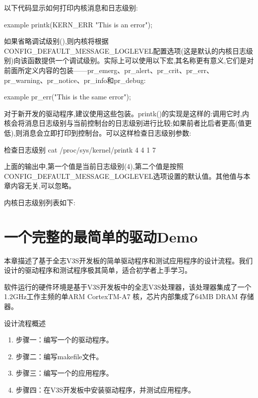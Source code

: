 \documentclass[lang=cn,newtx,10pt,scheme=chinese]{elegantbook}
\begin{document}
以下代码显示如何打印内核消息和日志级别:

\begin{mycode}{example}
    printk(KERN_ERR "This is an error\n");
\end{mycode}

如果省略调试级别(),则内核将根据CONFIG\_DEFAULT\_MESSAGE\_LOGLEVEL配置选项(这是默认的内核日志级别)向该函数提供一个调试级别。实际上可以使用以下宏,其名称更有意义,它们是对前面所定义内容的包装——pr\_emerg、pr\_alert、pr\_crit、pr\_err、pr\_warning、pr\_notice、pr\_info和pr\_debug:

\begin{mycode}{example}
    pr_err("This is the same error\n");
\end{mycode}

对于新开发的驱动程序,建议使用这些包装。printk()的实现是这样的:调用它时,内核会将消息日志级别与当前控制台的日志级别进行比较;如果前者比后者更高(值更低),则消息会立即打印到控制台。可以这样检查日志级别参数:

\begin{mycode}{检查日志级别}
    cat /proc/sys/kernel/printk
    4 4 1 7
\end{mycode}

上面的输出中,第一个值是当前日志级别(4),第二个值是按照CONFIG\_DEFAULT\_MESSAGE\_LOGLEVEL选项设置的默认值。其他值与本章内容无关,可以忽略。

内核日志级别列表如下:

\chapter{一个完整的最简单的驱动Demo}

本章描述了基于全志V3S开发板的简单驱动程序和测试应用程序的设计流程。我们设计的驱动程序和测试程序极其简单，适合初学者上手学习。

软件运行的硬件环境是基于V3S开发板中的全志V3S处理器，该处理器集成了一个1.2GHz工作主频的单ARM CortexTM-A7 核，芯片内部集成了64MB DRAM 存储器。

设计流程概述

\begin{enumerate}
    \item 步骤一：编写一个的驱动程序。
    \item 步骤二：编写makefile文件。
    \item 步骤三：编写一个的应用程序。
    \item 步骤四：在V3S开发板中安装驱动程序，并测试应用程序。
\end{enumerate}
\end{document}
